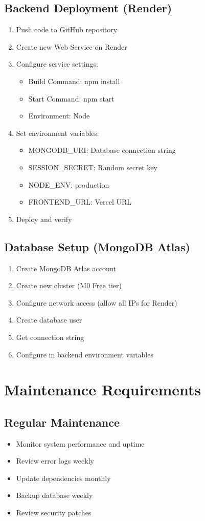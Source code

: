 \documentclass{scrreprt}
\begin{document}
\subsection{Backend Deployment (Render)}
\begin{enumerate}
\item Push code to GitHub repository
\item Create new Web Service on Render
\item Configure service settings:
\begin{itemize}
\item Build Command: npm install
\item Start Command: npm start
\item Environment: Node
\end{itemize}
\item Set environment variables:
\begin{itemize}
\item MONGODB\_URI: Database connection string
\item SESSION\_SECRET: Random secret key
\item NODE\_ENV: production
\item FRONTEND\_URL: Vercel URL
\end{itemize}
\item Deploy and verify
\end{enumerate}

\subsection{Database Setup (MongoDB Atlas)}
\begin{enumerate}
\item Create MongoDB Atlas account
\item Create new cluster (M0 Free tier)
\item Configure network access (allow all IPs for Render)
\item Create database user
\item Get connection string
\item Configure in backend environment variables
\end{enumerate}

\section{Maintenance Requirements}

\subsection{Regular Maintenance}
\begin{itemize}
\item Monitor system performance and uptime
\item Review error logs weekly
\item Update dependencies monthly
\item Backup database weekly
\item Review security patches
\end{itemize}
\end{document}
